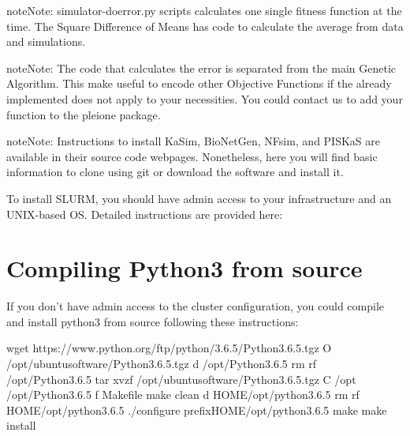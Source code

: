 \documentclass[letterpaper,10pt,english]{sphinxmanual}
\begin{document}
\begin{sphinxadmonition}{note}{Note:}
simulator-doerror.py scripts calculates one single fitness function at the time.
The Square Difference of Means has code to calculate the average from data and simulations.
\end{sphinxadmonition}

\begin{sphinxadmonition}{note}{Note:}
The code that calculates the error is separated from the main Genetic
Algorithm. This make useful to encode other Objective Functions if the
already implemented does not apply to your necessities. You could contact us
to add your function to the pleione package.
\end{sphinxadmonition}

\begin{sphinxadmonition}{note}{Note:}
Instructions to install KaSim, BioNetGen, NFsim, and PISKaS are
available in their source code webpages. Nonetheless, here you will find
basic information to clone using git or download the software and install
it.

To install SLURM, you should have admin access to your infrastructure and an
UNIX-based OS. Detailed instructions are provided here:
{\hyperref[\detokenize{SLURM:slurm-instructions}]{}}
\end{sphinxadmonition}


\chapter{Compiling Python3 from source}
\label{\detokenize{Python3:compiling-python3-from-source}}\label{\detokenize{Python3::doc}}
If you don’t have admin access to the cluster configuration, you could compile
and install python3 from source following these instructions:

\begin{sphinxVerbatim}[commandchars=\\\{\}]
wget https://www.python.org/ftp/python/3.6.5/Python\PYGZhy{}3.6.5.tgz 
\PYGZhy{}O \PYGZti{}/opt/ubuntu\PYGZhy{}software/Python\PYGZhy{}3.6.5.tgz
 \PYG{o}{[} \PYGZhy{}d \PYGZti{}/opt/Python\PYGZhy{}3.6.5 \PYG{o}{]}  rm \PYGZhy{}rf \PYGZti{}/opt/Python\PYGZhy{}3.6.5 
tar xvzf \PYGZti{}/opt/ubuntu\PYGZhy{}software/Python\PYGZhy{}3.6.5.tgz \PYGZhy{}C \PYGZti{}/opt
 \PYGZti{}/opt/Python\PYGZhy{}3.6.5
 \PYG{o}{[} \PYGZhy{}f Makefile \PYG{o}{]}  make clean 
 \PYG{o}{[} \PYGZhy{}d HOME/opt/python\PYGZhy{}3.6.5 \PYG{o}{]}  rm \PYGZhy{}rf HOME/opt/python\PYGZhy{}3.6.5 
./configure \PYGZhy{}\PYGZhy{}prefixHOME/opt/python\PYGZhy{}3.6.5
make
make install
\end{sphinxVerbatim}
\end{document}
